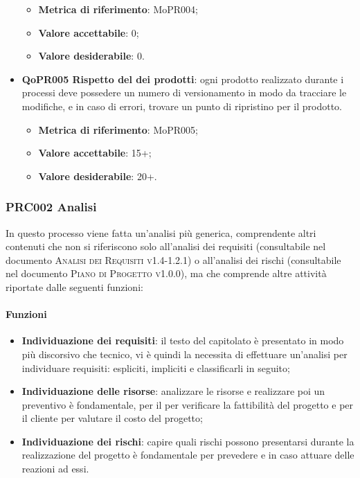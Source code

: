 \documentclass[../piano-di-qualifica.tex]{subfiles}
\begin{document}
\begin{itemize}
        \begin{itemize}
            \item \textbf{Metrica di riferimento}: MoPR004;
            \item \textbf{Valore accettabile}: 0; %
            \item \textbf{Valore desiderabile}: 0.
        \end{itemize}
    \item \textbf{QoPR005 Rispetto del  dei prodotti}: ogni prodotto realizzato durante i processi deve possedere un numero di versionamento in modo da tracciare le modifiche, e in caso di errori, trovare un punto di ripristino per il prodotto.
        \begin{itemize}
            \item \textbf{Metrica di riferimento}: MoPR005;
            \item \textbf{Valore accettabile}: 15+; %
            \item \textbf{Valore desiderabile}: 20+.
        \end{itemize}
\end{itemize}

\subsubsection{PRC002 Analisi}
\label{sub:analisi}
In questo processo viene fatta un'analisi più generica, comprendente altri contenuti che non si riferiscono solo all'analisi dei requisiti (consultabile nel documento \textsc{Analisi dei Requisiti v1.4-1.2.1}) o all'analisi dei rischi (consultabile nel documento \textsc{Piano di Progetto v1.0.0}), ma che comprende altre attività riportate dalle seguenti funzioni:

\paragraph{Funzioni}
\label{sub:funzioni_2}
\begin{itemize}
    \item \textbf{Individuazione dei requisiti}: il testo del capitolato è presentato in modo più discorsivo che tecnico, vi è quindi la necessita di effettuare un'analisi per individuare requisiti: espliciti, impliciti e classificarli in seguito;
    \item \textbf{Individuazione delle risorse}: analizzare le risorse e realizzare poi un preventivo è fondamentale, per il  per verificare la fattibilità del progetto e per il cliente per valutare il costo del progetto;
    \item \textbf{Individuazione dei rischi}: capire quali rischi possono presentarsi durante la realizzazione del progetto è fondamentale per prevedere e in caso attuare delle reazioni ad essi.
\end{itemize}
\end{document}
